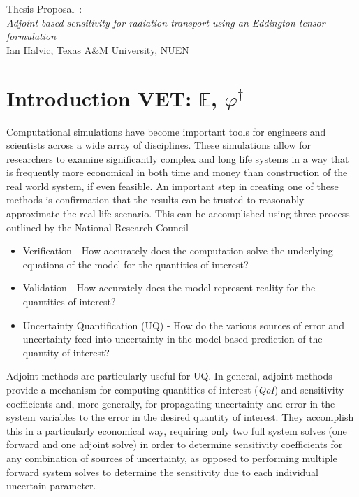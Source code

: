 \documentclass{article}
\newcommand{\Edd}{\mathbb{E}}
\newcommand{\qoi}{{\it QoI}\xspace}
\begin{document}
\begin{center}
{\large Thesis Proposal~:\\
{\it Adjoint-based sensitivity for radiation transport using an Eddington tensor formulation}}\\
\vspace{2mm}
Ian Halvic, Texas A\&M University, NUEN
\end{center}

\tableofcontents
\newpage

\section{Introduction    VET: $\Edd$, $\varphi^\dag$}

Computational simulations have become important tools for engineers and scientists across a wide array of disciplines. These simulations allow for researchers to examine significantly complex and long life systems in a way that is frequently more economical in both time and money than construction of the real world system, if even feasible. An important step in creating one of these methods is confirmation that the results can be trusted to reasonably approximate the real life scenario. This can be accomplished using three process outlined by the National Research Council \cite{NRCVVUQ}


\begin{itemize}
\item Verification - How accurately does the computation solve the underlying equations of the model for the quantities of interest?
\item Validation - How accurately does the model represent reality for the quantities of interest?
\item Uncertainty Quantification (UQ) -  How do the various sources of error and uncertainty feed into uncertainty in the model-based prediction of the quantity of interest?
\end{itemize}


Adjoint methods are particularly useful for UQ. In general, adjoint methods provide a mechanism for computing quantities of interest (\qoi) and sensitivity coefficients and, more generally, for propagating uncertainty and error in the system variables to the error in the desired quantity of interest. They accomplish this in a particularly economical way, requiring only two full system solves (one forward and one adjoint solve) in order to determine sensitivity coefficients for any combination of sources of uncertainty, as opposed to performing multiple forward system solves to determine
the sensitivity due to each individual uncertain parameter.
\end{document}
